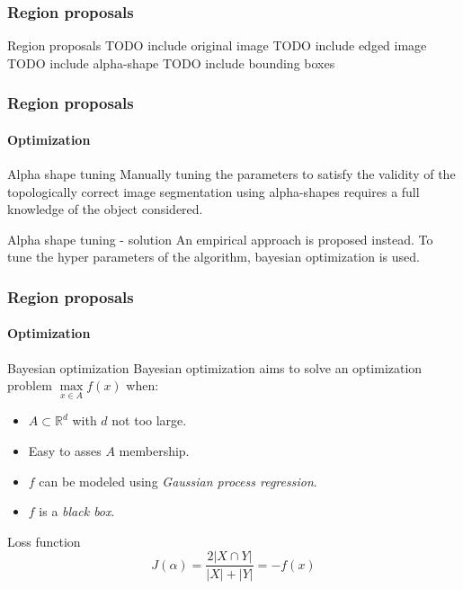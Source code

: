 \subsubsection{Region proposals}
\begin{frame}{Region proposals}
    TODO include original image
    TODO include edged image
    TODO include alpha-shape
    TODO include bounding boxes
\end{frame}

\begin{frame}
    \frametitle{Region proposals}
    \framesubtitle{Optimization}
     {
        \begin{alertblock}{Alpha shape tuning}
            Manually tuning the parameters to satisfy the validity of the topologically correct image segmentation using alpha-shapes requires a full knowledge of the object considered.
        \end{alertblock}
    }
     {
        \begin{exampleblock}{Alpha shape tuning - solution}
            An empirical approach is proposed instead. To tune the hyper parameters of the algorithm, bayesian optimization is used.
        \end{exampleblock}
    }
\end{frame}

\begin{frame}
    \frametitle{Region proposals}
    \framesubtitle{Optimization}
     {
        \begin{block}{Bayesian optimization}
            Bayesian optimization aims to solve an optimization problem $\max\limits_{x\in A}f\left(x\right)$ when:
            \begin{itemize}
                \item $A \subset \mathbb{R}^d$ with $d$ not too large.
                \item Easy to asses $A$ membership.
                \item $f$ can be modeled using \emph{Gaussian process regression}.
                \item $f$ is a \emph{black box}.
            \end{itemize}
        \end{block}
    }
     {
        \begin{exampleblock}{Loss function}
            \begin{equation}
                J\left(\alpha\right) = \frac{2\lvert X \cap Y \rvert}{\lvert X \rvert + \lvert Y \rvert} = -f(x)
            \end{equation}
        \end{exampleblock}
    }
\end{frame}

